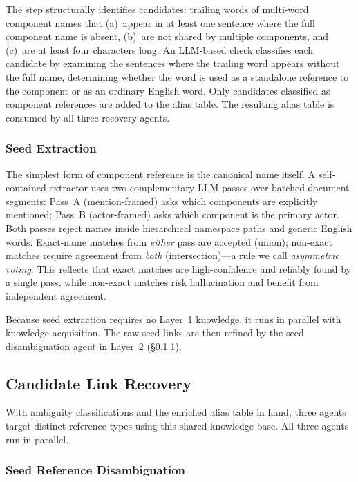 The step structurally identifies candidates: trailing words of
multi-word component names that (a)~appear in at least one sentence
where the full component name is absent, (b)~are not shared by
multiple components, and (c)~are at least four characters long.
An LLM-based check classifies each candidate by examining the
sentences where the trailing word appears without the full name,
determining whether the word is used as a standalone reference to
the component or as an ordinary English word.
Only candidates classified as component references are added to the
alias table.
The resulting alias table is consumed by all three recovery agents.

\subsubsection{Seed Extraction}\label{sec:seed-extraction}

The simplest form of component reference is the canonical name itself.
A self-contained extractor uses two complementary LLM passes over
batched document segments:
Pass~A (mention-framed) asks which components are explicitly
mentioned; Pass~B (actor-framed) asks which component is the
primary actor.
Both passes reject names inside hierarchical namespace paths and
generic English words.
Exact-name matches from \emph{either} pass are accepted (union);
non-exact matches require agreement from \emph{both}
(intersection)---a rule we call \emph{asymmetric voting}.
This reflects that exact matches are high-confidence and reliably
found by a single pass, while non-exact matches risk hallucination
and benefit from independent agreement.

Because seed extraction requires no Layer~1 knowledge, it runs in
parallel with knowledge acquisition.
The raw seed links are then refined by the seed disambiguation agent
in Layer~2 (\S\ref{sec:seed-disambig}).


\subsection{Candidate Link Recovery}\label{sec:recovery}

With ambiguity classifications and the enriched alias table in hand,
three agents target distinct reference types using this shared
knowledge base.
All three agents run in parallel.

\subsubsection{Seed Reference Disambiguation}\label{sec:seed-disambig}

